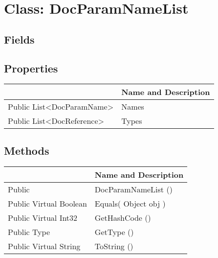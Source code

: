 \documentclass[11pt, oneside, a4paper]{book}
\begin{document}
\hypertarget{SoftwareEngineeringTools.{}Documentation.{}DocParamNameList}{}
\section{Class: DocParamNameList}

\subsection{Fields}

\subsection{Properties}
\begin{center}
\begin{tabular}{| p{3cm} | p{12cm} | }
\hline
\textbf{ } & \textbf{ Name and Description}\\
\hline
 Public  List<DocParamName> &  Names\hypertarget{SoftwareEngineeringTools.{}Documentation.{}DocParamNameList.{}Names}{}\\
\hline
 Public  List<DocReference> &  Types\hypertarget{SoftwareEngineeringTools.{}Documentation.{}DocParamNameList.{}Types}{}\\
\hline
\end{tabular}
\end{center}

\subsection{Methods}
\begin{center}
\begin{tabular}{| p{3cm} | p{12cm} | }
\hline
\textbf{ } & \textbf{ Name and Description}\\
\hline
 Public  &  DocParamNameList ()\hypertarget{SoftwareEngineeringTools.{}Documentation.{}DocParamNameList.{}DocParamNameList}{}\\
\hline
 Public  Virtual  Boolean &  Equals(\hypertarget{SoftwareEngineeringTools.{}Documentation.{}DocParamNameList.{}Equals\_Object}{} Object  obj  )\\
\hline
 Public  Virtual  Int32 &  GetHashCode ()\hypertarget{SoftwareEngineeringTools.{}Documentation.{}DocParamNameList.{}GetHashCode}{}\\
\hline
 Public  Type &  GetType ()\hypertarget{SoftwareEngineeringTools.{}Documentation.{}DocParamNameList.{}GetType}{}\\
\hline
 Public  Virtual  String &  ToString ()\hypertarget{SoftwareEngineeringTools.{}Documentation.{}DocParamNameList.{}ToString}{}\\
\hline
\end{tabular}
\end{center}
 
\end{document}
